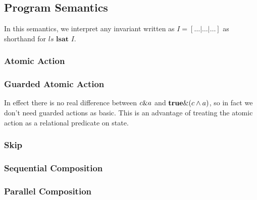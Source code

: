\newpage
\subsection{Program Semantics}

In this semantics, we interpret any invariant
written as $I = [\dots|\dots|\dots]$
as shorthand for $ls \textbf{ lsat } I$.

\subsubsection{Atomic Action}



\subsubsection{Guarded Atomic Action}
In effect there is no real difference between $c \& a$
and $\mathbf{true} \& (c \land a)$,
so in fact we don't need guarded actions as basic.
This is an advantage of treating the atomic action as a relational predicate
on state.



\subsubsection{Skip}


\subsubsection{Sequential Composition}


\subsubsection{Parallel Composition}

